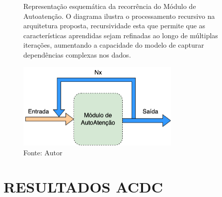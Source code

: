 \begin{figure}[H]
    \centering
    \captionsetup{width=0.98\textwidth, justification=justified}
    \caption{Representação esquemática da recorrência do Módulo de Autoatenção. O diagrama ilustra o processamento recursivo na arquitetura proposta, recursividade esta que permite que as características aprendidas sejam refinadas ao longo de múltiplas iterações, aumentando a capacidade do modelo de capturar dependências complexas nos dados.
    }
    \includegraphics[width=0.7\textwidth]{figures/fig030.png}
    \caption*{Fonte: Autor}
    \label{fig:fig030}
\end{figure}







\section{RESULTADOS ACDC}
\label{sec:resultados_acdc}


